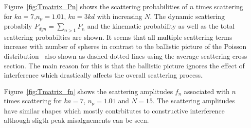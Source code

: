 Figure~\ref{fig:Tmatrix_Pn} shows the scattering probabilities of $n$ times scattering
for $ka=7$,$n_p=1.01$, $ka=3kd$ with increasing $N$.
The dynamic scattering probabily $P_{dyn}=\sum_{n>1}P_n$ and the kinematic
probability as well as the total scattering probabilties are shown.
It seems that all multiple scattering terms increase with number of spheres in
contrast to the ballistic picture of the Poisson distribution~\cite{} also shown
as dashed-dotted lines using the average scattering cross section.
The main reason for this is that the ballistic picture ignores the effect
of interference which drastically affects the overall scattering process.  

Figure~\ref{fig:Tmatrix_fn} shows the scattering amplitudes $f_n$ associated with
$n$ times scattering for $ka=7$, $n_p=1.01$ and $N=15$. The scattering amplitudes
have similar shapes which mostly contrbitutes to constructive interference although
sligth peak misalgnements can be seen.


%
%







